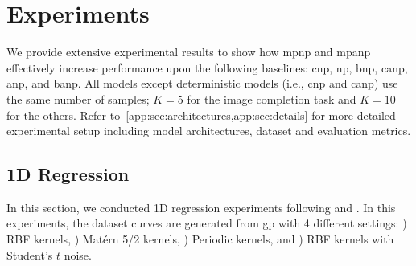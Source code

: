 \section{Experiments}
\label{main:sec:experiments}

We provide extensive experimental results to show how \gls{mpnp} and \gls{mpanp} effectively increase performance upon the following baselines: \gls{cnp}, \gls{np}, \gls{bnp}, \gls{canp}, \gls{anp}, and \gls{banp}. All models except deterministic models (i.e., \gls{cnp} and \gls{canp}) use the same number of samples; $K=5$ for the image completion task and $K=10$ for the others. Refer to~\cref{app:sec:architectures,app:sec:details} for more detailed experimental setup including model architectures, dataset and evaluation metrics.


\subsection{1D Regression}
\label{main:sec:experiments:1dregression}

In this section, we conducted 1D regression experiments following \citet{kim2018attentive} and \citet{lee2020bootstrapping}. 
In this experiments, the dataset curves are generated from \gls{gp} with 4 different settings: ) RBF kernels, ) Mat\'ern 5/2 kernels, ) Periodic kernels, and ) RBF kernels with Student's $t$ noise.

